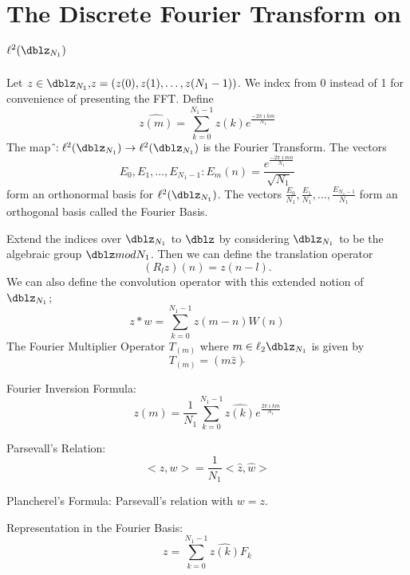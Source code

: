 \section*{The Discrete Fourier Transform on $\ell^2(\dblz_{N_1})$} Let $z \in \dblz_{N_1} ,\!
z=(z(0),z(1),\ldots,z(N_1-1))$.  We index from 0 instead of 1
for convenience of presenting the FFT. Define
\begin{equation*}
\widehat{z(m)}=\sum\limits_{k=0}^{N_1-1} z(k)e^{ \frac{-2 \pi
\imath k m}{N_1}}
\end{equation*}
The map $\hat \!: \ell^2(\dblz_{N_1}) \rightarrow
\ell^2(\dblz_{N_1})$ is the Fourier Transform. The vectors
\begin{equation*}
E_0,E_1, \ldots,E_{N_1 -1}  :\!  E_m(n)=\frac{e^\frac{-2 \pi
\imath m n}{N_1}}{\sqrt{N_1}}
\end{equation*}
form an orthonormal basis for $\ell^2(\dblz_{N_1})$. The
vectors $ \frac{E_0}{N_1},\frac{E_1}{N_1}, \ldots,\frac{E_{N_1
-1}}{N_1}$ form an orthogonal basis called the Fourier Basis.

Extend the indices over $\dblz_{N_1}$ to $\dblz$ by considering
$\dblz_{N_1}$ to be the algebraic group $\dblz mod N_1$.  Then
we can define the translation operator
\begin{equation*}
(R_l z)(n)=z(n-l).
\end{equation*}
We can also define the convolution operator with this extended
notion of $\dblz_{N_1}$;
\begin{equation*}
z * w = \sum \limits_{k=0}^{N_1-1} z(m-n)W(n)
\end{equation*}
The Fourier Multiplier Operator $T_{(m)}$ where $m \in
\ell_2{\dblz_{N_1}}$ is given by
\begin{equation*}
T_{(m)}=(m\hat z)\check{}
\end{equation*}

Fourier Inversion Formula:
\begin{equation*}
z(m)=\frac {1}{N_1}\sum\limits_{k=0}^{N_1-1} \hat{z(k)} e^{
\frac{2 \pi \imath k m}{N_1}}
\end{equation*}

Parsevall's Relation:
\begin{equation*}
<z,w>=\frac{1}{N_1}<\hat z,\hat w>
\end{equation*}

Plancherel's Formula: Parsevall's relation with $w=z$.

Representation in the Fourier Basis:
\begin{equation*}
z=\sum \limits_{k=0}^{N_1-1} \hat{z(k)} F_k
\end{equation*}


